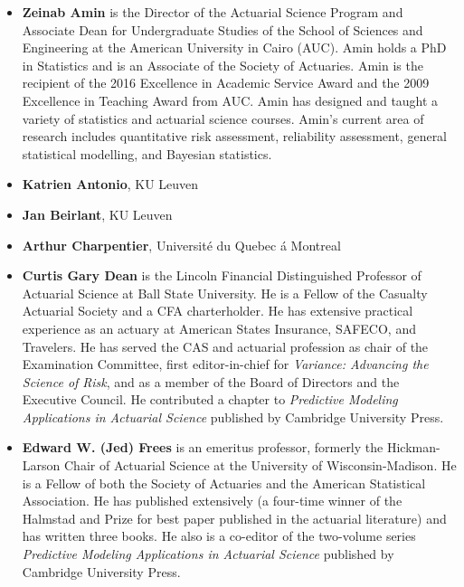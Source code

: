 \documentclass[]{book}
\providecommand{\tightlist}{%
  \setlength{\itemsep}{0pt}\setlength{\parskip}{0pt}}
\begin{document}
\begin{itemize}
\item
  \textbf{Zeinab Amin} is the Director of the Actuarial Science Program
  and Associate Dean for Undergraduate Studies of the School of Sciences
  and Engineering at the American University in Cairo (AUC). Amin holds
  a PhD in Statistics and is an Associate of the Society of Actuaries.
  Amin is the recipient of the 2016 Excellence in Academic Service Award
  and the 2009 Excellence in Teaching Award from AUC. Amin has designed
  and taught a variety of statistics and actuarial science courses.
  Amin's current area of research includes quantitative risk assessment,
  reliability assessment, general statistical modelling, and Bayesian
  statistics.
\item
  \textbf{Katrien Antonio}, KU Leuven
\item
  \textbf{Jan Beirlant}, KU Leuven
\item
  \textbf{Arthur Charpentier}, Université du Quebec á Montreal
\end{itemize}

\begin{itemize}
\tightlist
\item
  \textbf{Curtis Gary Dean} is the Lincoln Financial Distinguished
  Professor of Actuarial Science at Ball State University. He is a
  Fellow of the Casualty Actuarial Society and a CFA charterholder. He
  has extensive practical experience as an actuary at American States
  Insurance, SAFECO, and Travelers. He has served the CAS and actuarial
  profession as chair of the Examination Committee, first
  editor-in-chief for \emph{Variance: Advancing the Science of Risk},
  and as a member of the Board of Directors and the Executive Council.
  He contributed a chapter to \emph{Predictive Modeling Applications in
  Actuarial Science} published by Cambridge University Press.
\end{itemize}

\begin{itemize}
\tightlist
\item
  \textbf{Edward W. (Jed) Frees} is an emeritus professor, formerly the
  Hickman-Larson Chair of Actuarial Science at the University of
  Wisconsin-Madison. He is a Fellow of both the Society of Actuaries and
  the American Statistical Association. He has published extensively (a
  four-time winner of the Halmstad and Prize for best paper published in
  the actuarial literature) and has written three books. He also is a
  co-editor of the two-volume series \emph{Predictive Modeling
  Applications in Actuarial Science} published by Cambridge University
  Press.
\end{itemize}
\end{document}
